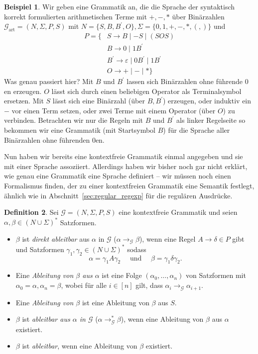 \documentclass[11pt, a4paper]{article}
\theoremstyle{definition}
\newtheorem{definition}{Definition}[section]
\newtheorem{example}[definition]{Beispiel}
\theoremstyle{plain}
\numberwithin{equation}{section}
\begin{document}
\begin{example}\label{exp:cfg_art}
	Wir geben eine Grammatik an, die die Sprache der syntaktisch korrekt formulierten arithmetischen Terme mit $+, -, \ast$ über Binärzahlen $\mathcal{G}_\text{art} = (N, \Sigma, P, S)$ mit $N = \{S, B, B^\prime, O\}, \Sigma = \{0, 1, +, - ,\ast, (, )\}$ und
	\begin{align*}
		P = \{ & S \to B \mid -S \mid (SOS)\\
		& B \to 0 \mid 1B^\prime\\
		& B^\prime \to \varepsilon \mid 0B^\prime \mid 1B^\prime\\
		& O \to + \mid - \mid \ast \}
	\end{align*}
	Was genau passiert hier? Mit $B$ und $B^\prime$ lassen sich Binärzahlen ohne führende $0$en erzeugen. $O$ lässt sich durch einen beliebigen Operator als Terminalsymbol ersetzen. Mit $S$ lässt sich eine Binärzahl (über $B, B^\prime$) erzeugen, oder induktiv ein $-$ vor einen Term setzen, oder zwei Terme mit einem Operator (über $O$) zu verbinden. Betrachten wir nur die Regeln mit $B$ und $B^\prime$ als linker Regelseite so bekommen wir eine Grammatik (mit Startsymbol $B$) für die Sprache aller Binärzahlen ohne führenden $0$en.
\end{example}
Nun haben wir bereits eine kontextfreie Grammatik einmal angegeben und sie mit einer Sprache assoziiert. Allerdings haben wir bisher noch gar nicht erklärt, wie genau eine Grammatik eine Sprache definiert -- wir müssen noch einen Formalismus finden, der zu einer kontextfreien Grammatik eine Semantik festlegt, ähnlich wie in Abschnitt~\ref{sec:regular_regexp} für die regulären Ausdrücke.
\begin{definition}
	Sei $\mathcal{G} = (N, \Sigma, P, S)$ eine kontextfreie Grammatik und seien $\alpha, \beta \in (N \cup \Sigma)^\ast$ Satzformen.
	\begin{itemize}
		\item $\beta$ ist \textit{direkt ableitbar} aus $\alpha$ in $\mathcal{G}$ ($\alpha \to_\mathcal{G} \beta$), wenn eine Regel $A \to \delta \in P$ gibt und Satzformen $\gamma_1, \gamma_2 \in (N \cup \Sigma)^\ast$ sodass
			$$
				\alpha = \gamma_1 A \gamma_2 \quad\text{ und }\quad \beta = \gamma_1 \delta \gamma_2. 
			$$
		\item Eine \textit{Ableitung von $\beta$ aus $\alpha$} ist eine Folge $(\alpha_0, \ldots, \alpha_n)$ von Satzformen mit $\alpha_0 = \alpha, \alpha_n = \beta$, wobei für alle $i \in [n]$ gilt, dass $\alpha_i \to_\mathcal{G} \alpha_{i+1}$.
		\item Eine \textit{Ableitung von $\beta$} ist eine Ableitung von $\beta$ aus $S$.
		\item $\beta$ ist \textit{ableitbar aus $\alpha$ in $\mathcal{G}$} ($\alpha \to_\mathcal{G}^\ast \beta$), wenn eine Ableitung von $\beta$ aus $\alpha$ existiert.
		\item $\beta$ ist \textit{ableitbar}, wenn eine Ableitung von $\beta$ existiert.
	\end{itemize}
\end{definition}
\end{document}
